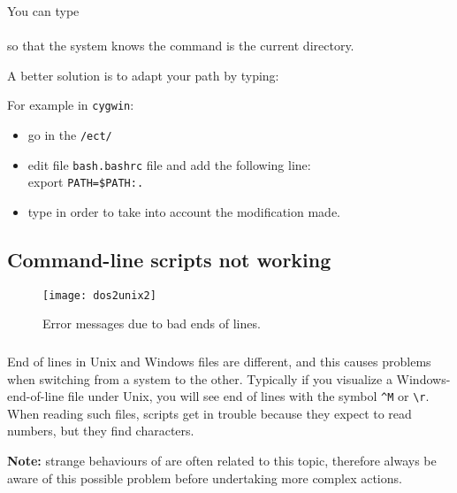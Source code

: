 You can type \\
\\
so that the system knows the command is the current directory.

A better solution is to adapt your path by typing:\\

For example in \texttt{cygwin}:\\
\begin{itemize}
\item go in the \texttt{/ect/}
\item edit file \texttt{bash.bashrc} file
and add the following line:\\
export \texttt{PATH=\$PATH:.}
\item type  in order to take into account the modification made.
\end{itemize}




\subsection{Command-line scripts not working}


\begin{figure}[htpb]
\centering
\texttt{[image: dos2unix2]}
\caption{Error messages due to bad ends of lines. \label{fig:error_dos2unix}}
\end{figure}

\subsubsection{\question}

End of lines in Unix and Windows files are different, and this causes problems when switching from a system to the other. Typically if you visualize a Windows-end-of-line file under Unix, you will see end of lines with the symbol \verb|^M| or \verb|\r|. When reading such files, scripts get in trouble because they expect to read numbers, but they find characters.

\textbf{Note:} strange behaviours of \diva are often related to this topic, therefore always be aware of this possible problem before undertaking more complex actions.

